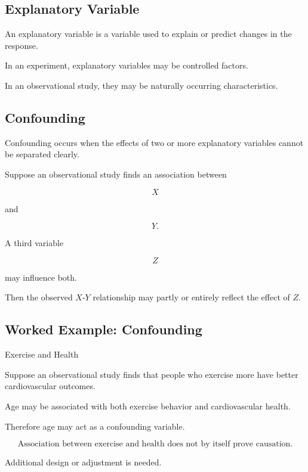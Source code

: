 \subsection{Explanatory Variable}
\label{subsec:explanatory-variable}

An explanatory variable is a variable used to explain or predict changes
in the response.

In an experiment, explanatory variables may be controlled factors.

In an observational study, they may be naturally occurring
characteristics.

\subsection{Confounding}
\label{subsec:confounding}

Confounding occurs when the effects of two or more explanatory variables
cannot be separated clearly.

Suppose an observational study finds an association between

\[
X
\]

and

\[
Y.
\]

A third variable

\[
Z
\]

may influence both.

Then the observed \(X\)-\(Y\) relationship may partly or entirely reflect
the effect of \(Z\).

\subsection{Worked Example: Confounding}
\label{subsec:worked-confounding}

\begin{workedexamplebox}{Exercise and Health}

Suppose an observational study finds that people who exercise more have
better cardiovascular outcomes.

Age may be associated with both exercise behavior and cardiovascular
health.

Therefore age may act as a confounding variable.

\begin{answerbox}
\[
\boxed{
\text{Association between exercise and health does not by itself prove
causation.}
}
\]
\end{answerbox}

Additional design or adjustment is needed.

\end{workedexamplebox}

